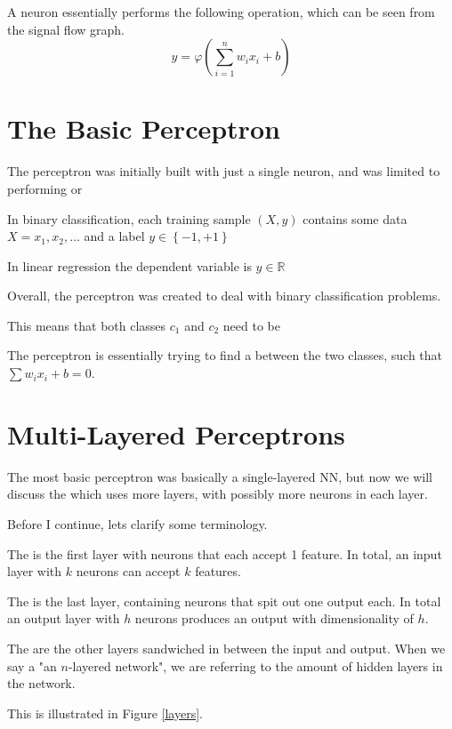 A neuron essentially performs the following operation, which can be seen from the signal flow graph.
\[ y = \varphi \left( \sum_{i=1}^{n} w_i x_i + b \right)\]

\section{The Basic Perceptron}

The perceptron was initially built with just a single neuron, and was limited to performing  or 
\begin{bullets}
	\item In binary classification, each training sample $(X,y)$ contains some data $X=x_1 , x_2, \ldots$ and a label $y\in\left\{ -1, +1 \right\}$
	\item In linear regression the dependent variable is $y\in\mathbb{R}$
\end{bullets}
Overall, the perceptron was created to deal with binary classification problems.
\begin{bullets}
	\item This means that both classes $c_1$ and $c_2$ need to be 
	\item The perceptron is essentially trying to find a  between the two classes, such that $\sum w_i x_i + b = 0$.
\end{bullets}

\section{Multi-Layered Perceptrons}

The most basic perceptron was basically a single-layered NN, but now we will discuss the  which uses more layers, with possibly more neurons in each layer.

Before I continue, lets clarify some terminology.
\begin{bullets}
	\item The  is the first layer with neurons that each accept 1 feature. In total, an input layer with $k$ neurons can accept $k$ features. 
	\item The  is the last layer, containing neurons that spit out one output each. In total an output layer with $h$ neurons produces an output with dimensionality of $h$.
	\item The  are the other layers sandwiched in between the input and output. When we say a "an $n$-layered network", we are referring to the amount of hidden layers in the network.
\end{bullets}
This is illustrated in Figure \ref{layers}.

